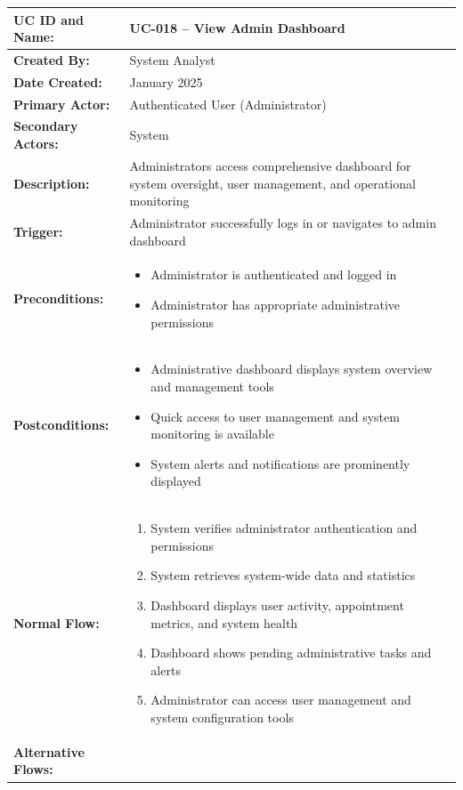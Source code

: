 \documentclass[12pt,a4paper]{article}
\begin{document}
\renewcommand{\arraystretch}{1.5}
\begin{longtable}{|p{4.5cm}|p{10.5cm}|}
\hline
\textbf{UC ID and Name:} & UC-018 – View Admin Dashboard \\
\hline
\textbf{Created By:} & System Analyst \\
\hline
\textbf{Date Created:} & January 2025 \\
\hline
\textbf{Primary Actor:} & Authenticated User (Administrator) \\
\hline
\textbf{Secondary Actors:} & System \\
\hline
\textbf{Description:} & Administrators access comprehensive dashboard for system oversight, user management, and operational monitoring \\
\hline
\textbf{Trigger:} & Administrator successfully logs in or navigates to admin dashboard \\
\hline
\textbf{Preconditions:} &
\begin{itemize}
  \item Administrator is authenticated and logged in
  \item Administrator has appropriate administrative permissions
\end{itemize} \\
\hline
\textbf{Postconditions:} &
\begin{itemize}
  \item Administrative dashboard displays system overview and management tools
  \item Quick access to user management and system monitoring is available
  \item System alerts and notifications are prominently displayed
\end{itemize} \\
\hline
\textbf{Normal Flow:} &
\begin{enumerate}
  \item System verifies administrator authentication and permissions
  \item System retrieves system-wide data and statistics
  \item Dashboard displays user activity, appointment metrics, and system health
  \item Dashboard shows pending administrative tasks and alerts
  \item Administrator can access user management and system configuration tools
\end{enumerate} \\
\hline
\textbf{Alternative Flows:} &

\end{longtable}
\end{document}
